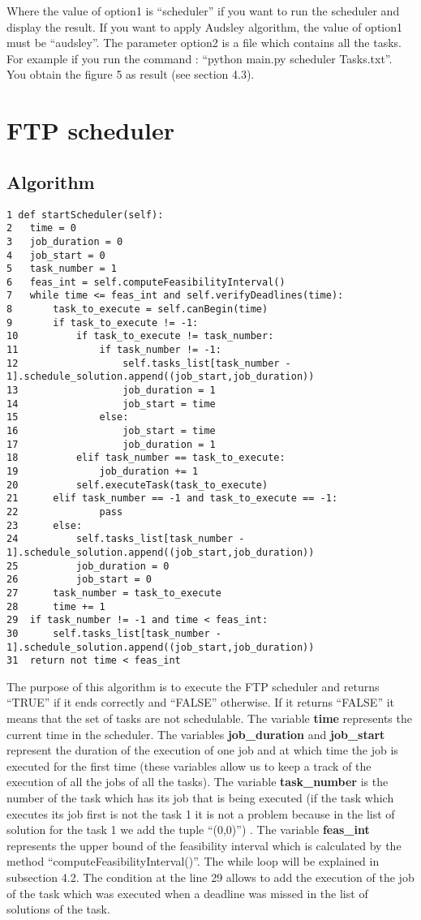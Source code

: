\documentclass[a4paper,12pt]{article}
\begin{document}
\noindent
Where the value of option1 is ``scheduler'' if you want to run the scheduler and display the result. If you want to apply Audsley algorithm, the value of option1 must be ``audsley''. The parameter option2 is a file which contains all the tasks. For example if you run the command : ``python main.py scheduler Tasks.txt''. You obtain the figure 5 as result (see section 4.3). 

\newpage

\section{FTP scheduler}
\subsection{Algorithm}

\begin{lstlisting}
1 def startScheduler(self):
2	time = 0
3	job_duration = 0
4	job_start = 0 
5	task_number = 1
6	feas_int = self.computeFeasibilityInterval()
7	while time <= feas_int and self.verifyDeadlines(time):
8		task_to_execute = self.canBegin(time)
9		if task_to_execute != -1:
10			if task_to_execute != task_number:
11				if task_number != -1:
12					self.tasks_list[task_number - 1].schedule_solution.append((job_start,job_duration))
13					job_duration = 1
14					job_start = time
15				else:
16					job_start = time
17					job_duration = 1
18			elif task_number == task_to_execute:
19				job_duration += 1
20			self.executeTask(task_to_execute)
21		elif task_number == -1 and task_to_execute == -1:
22				pass
23		else:
24			self.tasks_list[task_number - 1].schedule_solution.append((job_start,job_duration))
25			job_duration = 0
26			job_start = 0 
27		task_number = task_to_execute
28		time += 1
29	if task_number != -1 and time < feas_int:
30		self.tasks_list[task_number - 1].schedule_solution.append((job_start,job_duration))
31	return not time < feas_int
\end{lstlisting}

\smallskip
\noindent
The purpose of this algorithm is to execute the FTP scheduler and returns ``TRUE'' if it ends correctly and ``FALSE'' otherwise. If it returns ``FALSE'' it means that the set of tasks are not schedulable. The variable \textbf{time} represents the current time in the scheduler. The variables \textbf{job\_duration} and \textbf{job\_start} represent the duration of the execution of one job and at which time the job is executed for the first time (these variables allow us to keep a track of the execution of all the jobs of all the tasks). The variable \textbf{task\_number} is the number of the task which has its job that is being executed (if the task which executes its job first is not the task 1 it is not a problem because in the list of solution for the task 1 we add the tuple ``(0,0)'') . The variable \textbf{feas\_int} represents the upper bound of the feasibility interval which is calculated by the method ``computeFeasibilityInterval()''. The while loop will be explained in subsection 4.2. The condition at the line 29 allows to add the execution of the job of the task which was executed when a deadline was missed in the list of solutions of the task.
\end{document}
